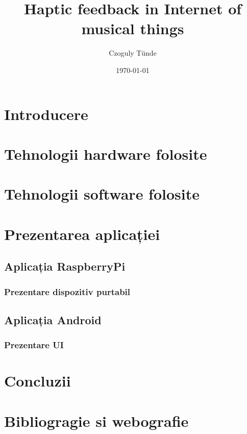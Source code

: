 \documentclass[a4paper, 12pt, titlepage]{article}
\title{Haptic feedback in Internet of musical things}
\author{Czoguly Tünde}
\date{\today}
\begin{document}
\maketitle
\tableofcontents

\newpage

\listoffigures

\newpage

\section{Introducere}


\newpage

\section{Tehnologii hardware folosite}


\newpage

\section{Tehnologii software folosite}


\newpage

\section{Prezentarea aplicației}
\subsection{Aplicația RaspberryPi}
\subsubsection{Prezentare dispozitiv purtabil}
\subsection{Aplicația Android}
\subsubsection{Prezentare UI}

\newpage

\section{Concluzii}

\newpage

\section{Bibliogragie si webografie}


\end{document}
